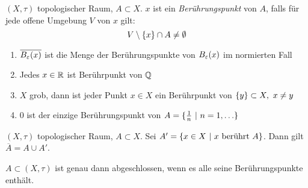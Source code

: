 \begin{dfn}
    $(X,\tau)$ topologischer Raum, $A\subset X$. $x$ ist ein \emph{Berührungspunkt}
    von $A$, falls für jede offene Umgebung $V$ von $x$ gilt:
    \[V\setminus \mdef{x}\cap A\neq \emptyset\]
    \begin{bsp}
        \begin{enumerate}
            \item $\overline{B_\varepsilon(x)}$ ist die Menge der Berührungspunkte von
                $B_\varepsilon(x)$ im normierten Fall
            \item Jedes $x\in\mathbb{R}$ ist Berührpunkt von $\mathbb{Q}$
            \item $X$ grob, dann ist jeder Punkt $x\in X$ ein Berührpunkt von
                $\mdef{y}\subset X,\ x\neq y$
            \item $0$ ist der einzige Berührungspunkt von
                $A=\mdef[\frac{1}{n}]{n=1,\ldots}$
        \end{enumerate}
    \end{bsp}
\end{dfn}

\begin{stz}
    $(X,\tau)$ topologischer Raum, $A\subset X$. Sei $A' = \mdef[x\in X]
    {x\text{ berührt } A}$. Dann gilt $\overline{A} = A\cup A'$.

    \begin{krl}
        $A\subset (X,\tau)$ ist genau dann abgeschlossen, wenn es alle seine
        Berührungspunkte enthält.
    \end{krl}
\end{stz}

